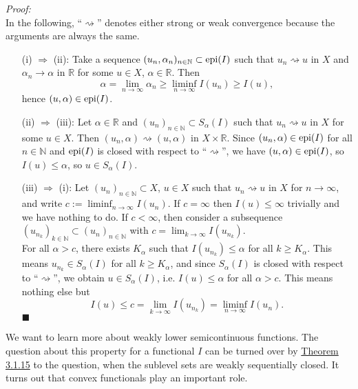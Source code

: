 \textit{Proof:}\\
In the following, ``$\rightsquigarrow$'' denotes either strong or weak convergence because the arguments are always the same.
\begin{itemize}
	\item[(i)] $\Rightarrow$ (ii): Take a sequence $(u_n,\alpha_n)_{n\in\mathbb{N}}\subset\operatorname{epi}\mathopen{}\left(I\right)\mathclose{}$ such that $u_n\rightsquigarrow u$ in $X$ and $\alpha_n\to\alpha$ in $\mathbb{R}$ for some $u\in X$, $\alpha\in\mathbb{R}$. Then
	\[\alpha=\lim_{n\to\infty}{\alpha_n}\geq\liminf_{n\to\infty}{I(u_n)}\geq I(u),\]
	hence $(u,\alpha)\in\operatorname{epi}\mathopen{}\left(I\right)\mathclose{}$.
	\item[(ii)] $\Rightarrow$ (iii): Let $\alpha\in\mathbb{R}$ and $(u_n)_{n\in\mathbb{N}}\subset S_\alpha(I)$ such that $u_n\rightsquigarrow u$ in $X$ for some $u\in X$. Then $(u_n,\alpha)\rightsquigarrow(u,\alpha)$ in $X\times\mathbb{R}$. Since $(u_n,\alpha)\in\operatorname{epi}\mathopen{}\left(I\right)\mathclose{}$ for all $n\in\mathbb{N}$ and $\operatorname{epi}\mathopen{}\left(I\right)\mathclose{}$ is closed with respect to ``$\rightsquigarrow$'', we have $(u,\alpha)\in\operatorname{epi}\mathopen{}\left(I\right)\mathclose{}$, so $I(u)\leq\alpha$, so $u\in S_\alpha(I)$.
	\item[(iii)] $\Rightarrow$ (i): Let $(u_n)_{n\in\mathbb{N}}\subset X$, $u\in X$ such that $u_n\rightsquigarrow u$ in $X$ for $n\to\infty$, and write $c:=\liminf_{n\to\infty}{I(u_n)}$. If $c=\infty$ then $I(u)\leq\infty$ trivially and we have nothing to do. If $c<\infty$, then consider a subsequence $(u_{n_k})_{k\in\mathbb{N}}\subset(u_n)_{n\in\mathbb{N}}$ with $c=\lim_{k\to\infty}{I(u_{n_k})}$.\\

	For all $\alpha>c$, there exists $K_\alpha$ such that $I(u_{n_k})\leq\alpha$ for all $k\geq K_\alpha$. This means $u_{n_k}\in S_\alpha(I)$ for all $k\geq K_\alpha$, and since $S_\alpha(I)$ is closed with respect to ``$\rightsquigarrow$'', we obtain $u\in S_\alpha(I)$, i.e. $I(u)\leq\alpha$ for all $\alpha>c$. This means nothing else but
	\[I(u)\leq c=\lim_{k\to\infty}{I(u_{n_k})}=\liminf_{n\to\infty}{I(u_n)}.\]
	\hfill$\blacksquare$\\[11pt]
\end{itemize}

We want to learn more about weakly lower semicontinuous functions. The question about this property for a functional $I$ can be turned over by \hyperlink{theorem_3_1_15}{Theorem 3.1.15} to the question, when the sublevel sets are weakly sequentially closed. It turns out that convex functionals play an important role.